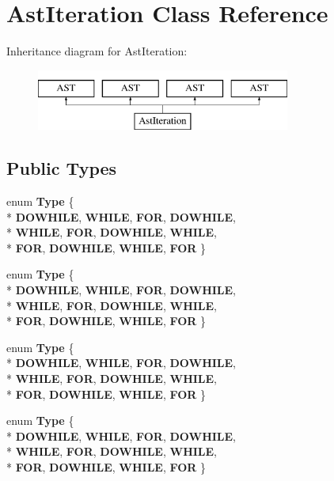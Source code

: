 \hypertarget{classAstIteration}{\section{Ast\-Iteration Class Reference}
\label{classAstIteration}
}
Inheritance diagram for Ast\-Iteration\-:\begin{figure}[H]
\begin{center}
\leavevmode
\includegraphics[height=2.000000cm]{classAstIteration}
\end{center}
\end{figure}
\subsection*{Public Types}
\begin{DoxyCompactItemize}
\item 
enum {\bfseries Type} \{ \\*
{\bfseries D\-O\-W\-H\-I\-L\-E}, 
{\bfseries W\-H\-I\-L\-E}, 
{\bfseries F\-O\-R}, 
{\bfseries D\-O\-W\-H\-I\-L\-E}, 
\\*
{\bfseries W\-H\-I\-L\-E}, 
{\bfseries F\-O\-R}, 
{\bfseries D\-O\-W\-H\-I\-L\-E}, 
{\bfseries W\-H\-I\-L\-E}, 
\\*
{\bfseries F\-O\-R}, 
{\bfseries D\-O\-W\-H\-I\-L\-E}, 
{\bfseries W\-H\-I\-L\-E}, 
{\bfseries F\-O\-R}
 \}
\item 
enum {\bfseries Type} \{ \\*
{\bfseries D\-O\-W\-H\-I\-L\-E}, 
{\bfseries W\-H\-I\-L\-E}, 
{\bfseries F\-O\-R}, 
{\bfseries D\-O\-W\-H\-I\-L\-E}, 
\\*
{\bfseries W\-H\-I\-L\-E}, 
{\bfseries F\-O\-R}, 
{\bfseries D\-O\-W\-H\-I\-L\-E}, 
{\bfseries W\-H\-I\-L\-E}, 
\\*
{\bfseries F\-O\-R}, 
{\bfseries D\-O\-W\-H\-I\-L\-E}, 
{\bfseries W\-H\-I\-L\-E}, 
{\bfseries F\-O\-R}
 \}
\item 
enum {\bfseries Type} \{ \\*
{\bfseries D\-O\-W\-H\-I\-L\-E}, 
{\bfseries W\-H\-I\-L\-E}, 
{\bfseries F\-O\-R}, 
{\bfseries D\-O\-W\-H\-I\-L\-E}, 
\\*
{\bfseries W\-H\-I\-L\-E}, 
{\bfseries F\-O\-R}, 
{\bfseries D\-O\-W\-H\-I\-L\-E}, 
{\bfseries W\-H\-I\-L\-E}, 
\\*
{\bfseries F\-O\-R}, 
{\bfseries D\-O\-W\-H\-I\-L\-E}, 
{\bfseries W\-H\-I\-L\-E}, 
{\bfseries F\-O\-R}
 \}
\item 
enum {\bfseries Type} \{ \\*
{\bfseries D\-O\-W\-H\-I\-L\-E}, 
{\bfseries W\-H\-I\-L\-E}, 
{\bfseries F\-O\-R}, 
{\bfseries D\-O\-W\-H\-I\-L\-E}, 
\\*
{\bfseries W\-H\-I\-L\-E}, 
{\bfseries F\-O\-R}, 
{\bfseries D\-O\-W\-H\-I\-L\-E}, 
{\bfseries W\-H\-I\-L\-E}, 
\\*
{\bfseries F\-O\-R}, 
{\bfseries D\-O\-W\-H\-I\-L\-E}, 
{\bfseries W\-H\-I\-L\-E}, 
{\bfseries F\-O\-R}
 \}
\end{DoxyCompactItemize}
